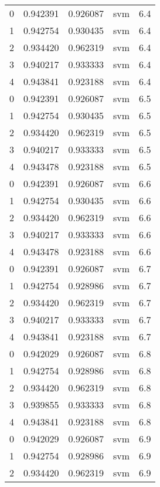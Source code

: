 \begin{tabular}{rrrlr}
     0 & 0.942391 & 0.926087 &      svm &        6.4 \\
     1 & 0.942754 & 0.930435 &      svm &        6.4 \\
     2 & 0.934420 & 0.962319 &      svm &        6.4 \\
     3 & 0.940217 & 0.933333 &      svm &        6.4 \\
     4 & 0.943841 & 0.923188 &      svm &        6.4 \\
     0 & 0.942391 & 0.926087 &      svm &        6.5 \\
     1 & 0.942754 & 0.930435 &      svm &        6.5 \\
     2 & 0.934420 & 0.962319 &      svm &        6.5 \\
     3 & 0.940217 & 0.933333 &      svm &        6.5 \\
     4 & 0.943478 & 0.923188 &      svm &        6.5 \\
     0 & 0.942391 & 0.926087 &      svm &        6.6 \\
     1 & 0.942754 & 0.930435 &      svm &        6.6 \\
     2 & 0.934420 & 0.962319 &      svm &        6.6 \\
     3 & 0.940217 & 0.933333 &      svm &        6.6 \\
     4 & 0.943478 & 0.923188 &      svm &        6.6 \\
     0 & 0.942391 & 0.926087 &      svm &        6.7 \\
     1 & 0.942754 & 0.928986 &      svm &        6.7 \\
     2 & 0.934420 & 0.962319 &      svm &        6.7 \\
     3 & 0.940217 & 0.933333 &      svm &        6.7 \\
     4 & 0.943841 & 0.923188 &      svm &        6.7 \\
     0 & 0.942029 & 0.926087 &      svm &        6.8 \\
     1 & 0.942754 & 0.928986 &      svm &        6.8 \\
     2 & 0.934420 & 0.962319 &      svm &        6.8 \\
     3 & 0.939855 & 0.933333 &      svm &        6.8 \\
     4 & 0.943841 & 0.923188 &      svm &        6.8 \\
     0 & 0.942029 & 0.926087 &      svm &        6.9 \\
     1 & 0.942754 & 0.928986 &      svm &        6.9 \\
     2 & 0.934420 & 0.962319 &      svm &        6.9 \\

\end{tabular}

